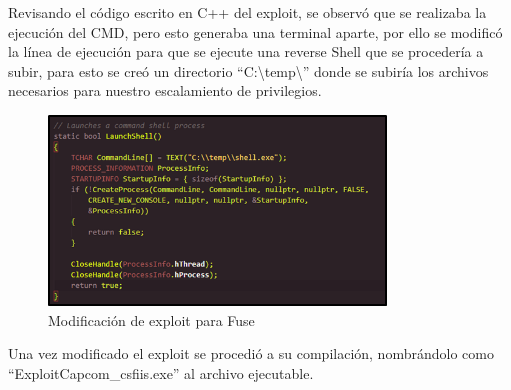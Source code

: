 Revisando el código escrito en C++ del exploit, se observó que se realizaba la ejecución del CMD, pero esto generaba una terminal aparte, por ello se modificó la línea de ejecución para que se ejecute una reverse Shell que se procedería a subir, para esto se creó un directorio “C:\textbackslash{}temp\textbackslash{}” donde se subiría los archivos necesarios para nuestro escalamiento de privilegios.
\begin{figure}[H]
    \centering
    \includegraphics[width=0.8\textwidth]{imagenes/modexfuse.png}
    \caption{Modificación de exploit para Fuse}
\end{figure}
Una vez modificado el exploit se procedió a su compilación, nombrándolo como “ExploitCapcom\_csfiis.exe” al archivo ejecutable.

